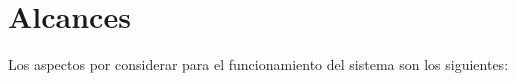 \section{Alcances}
Los aspectos por considerar para el funcionamiento del sistema son los siguientes:


